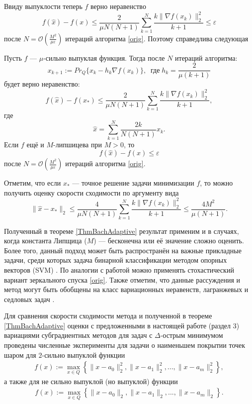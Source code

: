 Ввиду выпуклости теперь $f$ верно неравенство
$$
     f(\widehat{x}) - f(x) \leq \frac{2}{\mu N (N + 1)} \sum_{k=1}^{N} \frac{k \| \nabla f(x_k)\|^2_2}{k + 1} \leq \varepsilon
$$
после $N = \mathcal{O}(\frac{M^2}{\mu\varepsilon})$ итераций алгоритма \eqref{orig}. Поэтому справедлива следующая
\begin{theorem}\label{ThmBachAdaptive}
Пусть $f$ --- $\mu$-сильно выпуклая функция. Тогда после $N$ итераций алгоритма:
$$
    x_{k+1} := Pr_{Q}\{x_k - h_k \nabla f(x_k) \}, \;\; \textit{где} \; h_k = \frac{2}{\mu (k+1)}
$$
будет верно неравенство:
\begin{equation}\label{adaptive_estimation_f}
    f(\widehat{x}) - f(x_*) \leq \frac{2}{\mu N (N+1)} \sum_{k=1}^{N} \frac{k \|\nabla f(x_k)\|_2^2}{k+1},
\end{equation}
где
$$
    \widehat{x} = \sum_{k=1}^{N} \frac{2 k}{N (N+1)} x_k.
$$
Если $f$ ещё и $M$-липшицева при $M >0$, то
$$
     f(\widehat{x}) - f(x) \leq \varepsilon
$$
после $N = \mathcal{O}(\frac{M^2}{\mu\varepsilon})$ итераций алгоритма \eqref{orig}.
\end{theorem}

Отметим, что если $x_*$ --- точное решение задачи минимизации $f$, то можно получить оценку скорости сходимости по аргументу вида
\begin{equation} \label{arg_est}
    \|\widehat{x} - x_*\|_2 \leq \frac{4}{\mu N (N+1)} \sum_{k=1}^{N} \frac{k \|\nabla f(x_k)\|_2^2}{k+1} \leq \frac{4M^2}{\mu(N+1)}.
\end{equation}

Полученный в теореме \ref{ThmBachAdaptive} результат применим и в случаях, когда константа Липщица ($M$) --- бесконечна или её значение сложно оценить. Более того, данный подход может быть распространён на важные прикладные задачи, среди которых задача бинарной классификации методом опорных векторов (SVM) \cite{Bach_2012}. По аналогии с работой \cite{Bach_2012} можно применять стохастический вариант зеркального спуска \eqref{orig}. Также отметим, что данные рассуждения и метод могут быть обобщены на класс вариационных неравенств, лагранжевых и седловых задач \cite{Stonyakin_2021}. 

Для сравнения скорости сходимости метода \cite{Bach_2012} и полученной в теореме \ref{ThmBachAdaptive} оценки с предложенными в настоящей работе (раздел 3) вариациями субградиентных методов для задач с $\Delta$-острым минимумом проведены численные эксперименты для задачи о наименьшем покрытии точек шаром для $2$-сильно выпуклой функции
\begin{gather}\label{sphere_cover_strongly}
    f(x) := \max_{x\in Q}\left\{\|x - a_0\|_2^2, \|x - a_1\|_2^2, ..., \|x - a_m\|_2^2\right\},
\end{gather}
а также для не сильно выпуклой (но выпуклой) функции
\begin{gather}\label{sphere_cover}
    f(x) := \max_{x\in Q}\left\{\|x - a_0\|_2, \|x - a_1\|_2, ..., \|x - a_m\|_2\right\}.
\end{gather}

